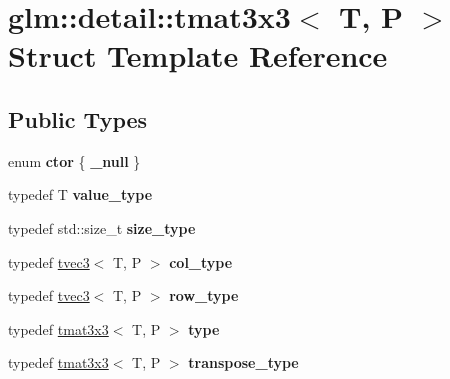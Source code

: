 \hypertarget{structglm_1_1detail_1_1tmat3x3}{\section{glm\-:\-:detail\-:\-:tmat3x3$<$ T, P $>$ Struct Template Reference}
\label{structglm_1_1detail_1_1tmat3x3}
}
\subsection*{Public Types}
\begin{DoxyCompactItemize}
\item 
enum {\bfseries ctor} \{ {\bfseries \-\_\-null}
 \}
\item 
\hypertarget{structglm_1_1detail_1_1tmat3x3_a42b16ee1a345e9626c90ff078ec056b4}{typedef T {\bfseries value\-\_\-type}}\label{structglm_1_1detail_1_1tmat3x3_a42b16ee1a345e9626c90ff078ec056b4}

\item 
\hypertarget{structglm_1_1detail_1_1tmat3x3_ac2c45ac2aeb10c76e17a54cae3652819}{typedef std\-::size\-\_\-t {\bfseries size\-\_\-type}}\label{structglm_1_1detail_1_1tmat3x3_ac2c45ac2aeb10c76e17a54cae3652819}

\item 
\hypertarget{structglm_1_1detail_1_1tmat3x3_ad47f3a11bd4333d1103bfa93a86fa54f}{typedef \hyperlink{structglm_1_1detail_1_1tvec3}{tvec3}$<$ T, P $>$ {\bfseries col\-\_\-type}}\label{structglm_1_1detail_1_1tmat3x3_ad47f3a11bd4333d1103bfa93a86fa54f}

\item 
\hypertarget{structglm_1_1detail_1_1tmat3x3_ad963d0adf30cc0c48a2c4166d8fa93b9}{typedef \hyperlink{structglm_1_1detail_1_1tvec3}{tvec3}$<$ T, P $>$ {\bfseries row\-\_\-type}}\label{structglm_1_1detail_1_1tmat3x3_ad963d0adf30cc0c48a2c4166d8fa93b9}

\item 
\hypertarget{structglm_1_1detail_1_1tmat3x3_a8da2644146b18508927325b04c3a9170}{typedef \hyperlink{structglm_1_1detail_1_1tmat3x3}{tmat3x3}$<$ T, P $>$ {\bfseries type}}\label{structglm_1_1detail_1_1tmat3x3_a8da2644146b18508927325b04c3a9170}

\item 
\hypertarget{structglm_1_1detail_1_1tmat3x3_a3ecde8b3a849d43a5aefed5f542c041f}{typedef \hyperlink{structglm_1_1detail_1_1tmat3x3}{tmat3x3}$<$ T, P $>$ {\bfseries transpose\-\_\-type}}\label{structglm_1_1detail_1_1tmat3x3_a3ecde8b3a849d43a5aefed5f542c041f}

\end{DoxyCompactItemize}

